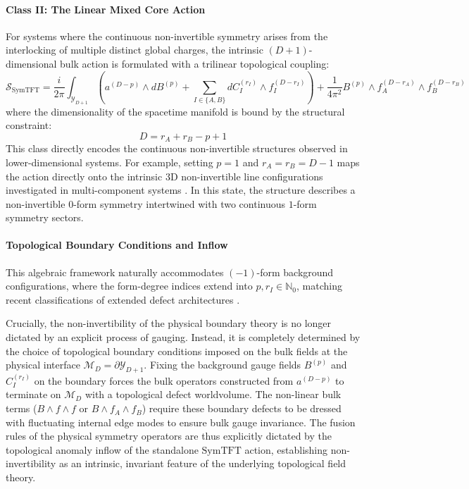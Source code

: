 \documentclass[aps,preprint,nofootinbib,preprintnumbers,eqsecnum,superscriptaddress]{revtex4}
\numberwithin{equation}{section}
\begin{document}
\paragraph{Class II: The Linear Mixed Core Action}
For systems where the continuous non-invertible symmetry arises from the interlocking of multiple distinct global charges, the intrinsic $(D+1)$-dimensional bulk action is formulated with a trilinear topological coupling:
\begin{equation}\label{eq:intrinsic_symtft_bff}
    \mathcal{S}_\text{SymTFT} = \frac{i}{2\pi} \int_{\mathcal{Y}_{D+1}} \left( a^{(D-p)} \wedge dB^{(p)} + \sum_{I \in \{A,B\}} dC^{(r_I)}_I \wedge f^{(D-r_I)}_I \right) + \frac{1}{4\pi^2} B^{(p)} \wedge f^{(D-r_A)}_A \wedge f^{(D-r_B)}_B
\end{equation}
where the dimensionality of the spacetime manifold is bound by the structural constraint:
\begin{equation}
    D = r_A + r_B - p + 1
\end{equation}
This class directly encodes the continuous non-invertible structures observed in lower-dimensional systems. For example, setting $p=1$ and $r_A = r_B = D-1$ maps the action directly onto the intrinsic $3\text{D}$ non-invertible line configurations investigated in multi-component systems \cite{Damia_2023}. In this state, the structure describes a non-invertible $0$-form symmetry intertwined with two continuous $1$-form symmetry sectors.

\paragraph{Topological Boundary Conditions and Inflow}
This algebraic framework naturally accommodates $(-1)$-form background configurations, where the form-degree indices extend into $p, r_I \in \mathbb{N}_0$, matching recent classifications of extended defect architectures \cite{banerjee2026notes2formsymmetries}. 

Crucially, the non-invertibility of the physical boundary theory is no longer dictated by an explicit process of gauging. Instead, it is completely determined by the choice of topological boundary conditions imposed on the bulk fields at the physical interface $\mathcal{M}_D = \partial \mathcal{Y}_{D+1}$. Fixing the background gauge fields $B^{(p)}$ and $C^{(r_I)}_I$ on the boundary forces the bulk operators constructed from $a^{(D-p)}$ to terminate on $\mathcal{M}_D$ with a topological defect worldvolume. The non-linear bulk terms ($B \wedge f \wedge f$ or $B \wedge f_A \wedge f_B$) require these boundary defects to be dressed with fluctuating internal edge modes to ensure bulk gauge invariance. The fusion rules of the physical symmetry operators are thus explicitly dictated by the topological anomaly inflow of the standalone $\text{SymTFT}$ action, establishing non-invertibility as an intrinsic, invariant feature of the underlying topological field theory.
\end{document}
